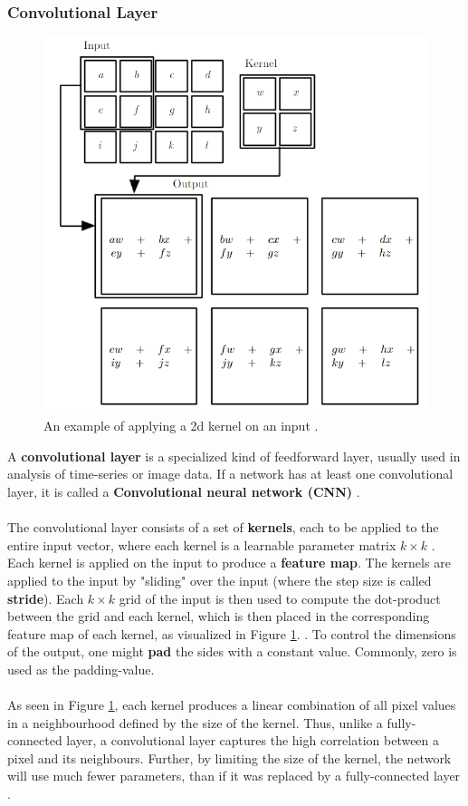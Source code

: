 \documentclass[./main.tex]{subfiles}
\begin{document}
\subsubsection{Convolutional Layer}
\begin{figure}[htbp]
    \centering
    \includegraphics[width = 0.5 \textwidth]{./entities/2d_conv_example.PNG}
    \caption{An example of applying a 2d kernel on an input \cite{DL_book}.}
    \label{fig:2d_conv_example}
\end{figure}
\noindent A \textbf{convolutional layer} is a specialized kind of feedforward layer, usually used in analysis of time-series or image data. If a network has at least one convolutional layer, it is called a \textbf{Convolutional neural network (CNN)} \cite{DL_book}.
\\
\\
\noindent The convolutional layer consists of a set of \textbf{kernels}, each to be applied to the entire input vector, where each kernel is a learnable parameter matrix $k \times k$ \cite{everything}. Each kernel is applied on the input to produce a \textbf{feature map}. The kernels are applied to the input by "sliding" over the input (where the step size is called \textbf{stride}). Each $k \times k$ grid of the input is then used to compute the dot-product between the grid and each kernel, which is then placed in the corresponding feature map of each kernel, as visualized in Figure \ref{fig:2d_conv_example}. \cite{bsc_thesis}. To control the dimensions of the output, one might \textbf{pad} the sides with a constant value. Commonly, zero is used as the padding-value.
\\
\\
As seen in Figure \ref{fig:2d_conv_example}, each kernel produces a linear combination of all pixel values in a neighbourhood defined by the size of the kernel. Thus, unlike a fully-connected layer, a convolutional layer captures the high correlation between a pixel and its neighbours. Further, by limiting the size of the kernel, the network will use much fewer parameters, than if it was replaced by a fully-connected layer \cite{DL_book}.
\end{document}
